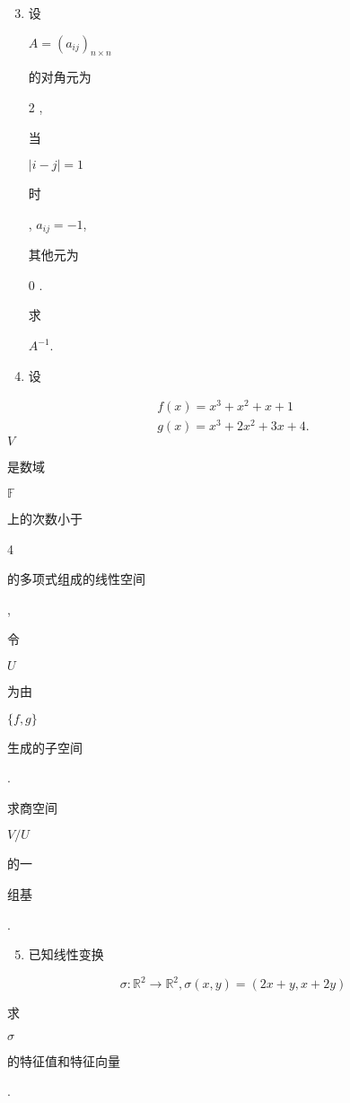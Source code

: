 \documentclass[10pt]{article}
\begin{document}
\begin{enumerate}
  \setcounter{enumi}{2}
  \item \begin{CJK}{UTF8}{mj}设\end{CJK} $A=\left(a_{i j}\right)_{n \times n}$ \begin{CJK}{UTF8}{mj}的对角元为\end{CJK} 2 , \begin{CJK}{UTF8}{mj}当\end{CJK} $|i-j|=1$ \begin{CJK}{UTF8}{mj}时\end{CJK}, $a_{i j}=-1$, \begin{CJK}{UTF8}{mj}其他元为\end{CJK} 0 . \begin{CJK}{UTF8}{mj}求\end{CJK} $A^{-1}$.

  \item \begin{CJK}{UTF8}{mj}设\end{CJK}

\end{enumerate}
$$
\begin{gathered}
f(x)=x^{3}+x^{2}+x+1 \\
g(x)=x^{3}+2 x^{2}+3 x+4 .
\end{gathered}
$$
$V$ \begin{CJK}{UTF8}{mj}是数域\end{CJK} $\mathbb{F}$ \begin{CJK}{UTF8}{mj}上的次数小于\end{CJK} 4 \begin{CJK}{UTF8}{mj}的多项式组成的线性空间\end{CJK}, \begin{CJK}{UTF8}{mj}令\end{CJK} $U$ \begin{CJK}{UTF8}{mj}为由\end{CJK} $\{f, g\}$ \begin{CJK}{UTF8}{mj}生成的子空间\end{CJK}. \begin{CJK}{UTF8}{mj}求商空间\end{CJK} $V / U$ \begin{CJK}{UTF8}{mj}的一\end{CJK} \begin{CJK}{UTF8}{mj}组基\end{CJK}.

\begin{enumerate}
  \setcounter{enumi}{4}
  \item \begin{CJK}{UTF8}{mj}已知线性变换\end{CJK}
\end{enumerate}
$$
\sigma: \mathbb{R}^{2} \rightarrow \mathbb{R}^{2}, \sigma(x, y)=(2 x+y, x+2 y)
$$
\begin{CJK}{UTF8}{mj}求\end{CJK} $\sigma$ \begin{CJK}{UTF8}{mj}的特征值和特征向量\end{CJK}.
\end{document}
